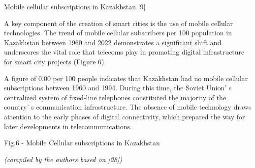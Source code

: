\begin{multicols}{2}
Mobile cellular subscriptions in Kazakhstan {[}9{]}

A key component of the creation of smart cities is the use of mobile
cellular technologies. The trend of mobile cellular subscribers per 100
population in Kazakhstan between 1960 and 2022 demonstrates a
significant shift and underscores the vital role that telecoms play in
promoting digital infrastructure for smart city projects (Figure 6).

A figure of 0.00 per 100 people indicates that Kazakhstan had no mobile
cellular subscriptions between 1960 and 1994. During this time, the
Soviet Union' s centralized system of fixed-line
telephones constituted the majority of the country' s
communication infrastructure. The absence of mobile technology draws
attention to the early phases of digital connectivity, which prepared
the way for later developments in telecommunications.
\end{multicols}

Fig.6 - Mobile Cellular subscriptions in Kazakhstan

\emph{(compiled by the authors based on {[}28{]})}

